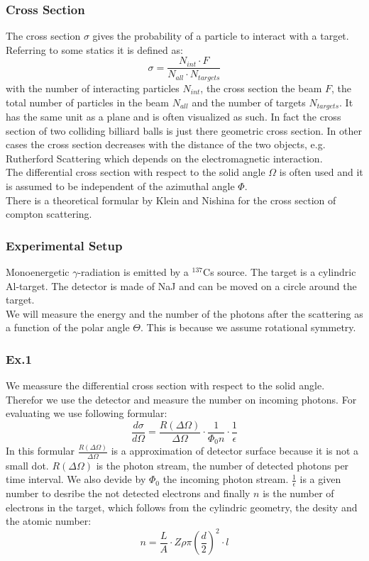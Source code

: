 \subsubsection{Cross Section}
The cross section $\sigma$ gives the probability of a particle to interact with a target. Referring to some statics it is defined as:
$$\sigma = \frac{N_{int} \cdot F}{N_{all} \cdot N_{targets}} $$
with the number of interacting particles $N_{int}$, the cross section the beam $F$, the total number of particles in the beam $N_{all}$ and the number of targets $N_{targets}$. It has the same unit as a plane and is often visualized as such. In fact the cross section of two colliding billiard balls is just there geometric cross section. In other cases the cross section decreases with the distance of the two objects, e.g. Rutherford Scattering which depends on the electromagnetic interaction.\\
The differential cross section with respect to the solid angle $\Omega$ is often used and it is assumed to be independent of the azimuthal angle $\Phi$.\\
There is a theoretical formular by Klein and Nishina for the cross section of compton scattering.

\subsubsection{Experimental Setup}
Monoenergetic $\gamma$-radiation is emitted by a $^{137}$Cs source. The target is a cylindric Al-target. The detector is made of NaJ and can be moved on a circle around the target. \\
We will measure the energy and the number of the photons after the scattering as a function of the polar angle $\Theta$. This is because we assume rotational symmetry.

\subsubsection{Ex.1}
We meassure the differential cross section with respect to the solid angle. Therefor we use the detector and measure the number on incoming photons. For evaluating we use following formular:
$$\frac{d\sigma}{d\Omega} = \frac{R(\Delta \Omega)}{\Delta \Omega} \cdot \frac{1}{\Phi _0 n} \cdot \frac{1}{\epsilon} $$
In this formular $\frac{R(\Delta \Omega)}{\Delta \Omega}$ is a approximation of detector surface because it is not a small dot. $R(\Delta \Omega)$ is the photon stream, the number of detected photons per time interval. We also devide by $\Phi _0$ the incoming photon stream. $\frac{1}{\epsilon}$ is a given number to desribe the not detected electrons and finally $n$ is the number of electrons in the target, which follows from the cylindric geometry, the desity and the atomic number:
$$n =  \frac{L}{A} \cdot Z \rho \pi (\frac{d}{2})^{2} \cdot l $$

